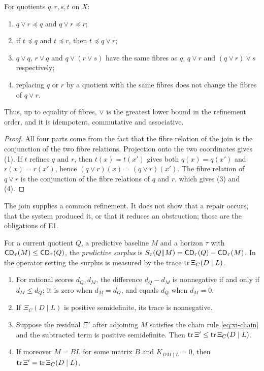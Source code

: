 \begin{proposition}\label{prop:d1}
For quotients $q, r, s, t$ on $X$:
\begin{enumerate}
  \item $q \vee r \preceq q$ and $q \vee r \preceq r$;
  \item if $t \preceq q$ and $t \preceq r$, then $t \preceq q \vee r$;
  \item $q \vee q$, $r \vee q$ and $q \vee (r \vee s)$ have the same fibres as $q$, $q \vee r$ and
    $(q \vee r) \vee s$ respectively;
  \item replacing $q$ or $r$ by a quotient with the same fibres does not change the fibres of
    $q \vee r$.
\end{enumerate}
Thus, up to equality of fibres, $\vee$ is the greatest lower bound in the refinement order, and it
is idempotent, commutative and associative.
\end{proposition}

\begin{proof}
All four parts come from the fact that the fibre relation of the join is the conjunction of the two fibre relations.
Projection onto the two coordinates gives (1). If $t$ refines $q$ and $r$, then $t(x) = t(x')$
gives both $q(x) = q(x')$ and $r(x) = r(x')$, hence $(q \vee r)(x) = (q \vee r)(x')$. The fibre
relation of $q \vee r$ is the conjunction of the fibre relations of $q$ and $r$, which gives (3)
and (4).
\end{proof}

The join supplies a common refinement. It does not show that a repair occurs, that the system
produced it, or that it reduces an obstruction; those are the obligations of E1.

\begin{definition}\label{def:d2}
For a current quotient $Q$, a predictive baseline $M$ and a horizon $\tau$ with
$\mathsf{CD}_\tau(M) \le \mathsf{CD}_\tau(Q)$, the \emph{predictive surplus} is
$S_\tau(Q \Vert M) = \mathsf{CD}_\tau(Q) - \mathsf{CD}_\tau(M)$. In the operator setting the surplus is measured by
the trace $\operatorname{tr} \Xi_C(D \mid L)$.
\end{definition}

\begin{proposition}\label{prop:d2}
\begin{enumerate}
  \item For rational scores $d_Q, d_M$, the difference $d_Q - d_M$ is nonnegative if and only if
    $d_M \le d_Q$; it is zero when $d_M = d_Q$, and equals $d_Q$ when $d_M = 0$.
  \item If $\Xi_C(D \mid L)$ is positive semidefinite, its trace is nonnegative.
  \item Suppose the residual $\Xi'$ after adjoining $M$ satisfies the chain rule
    \eqref{eq:xi-chain} and the subtracted term is positive semidefinite. Then
    $\operatorname{tr} \Xi' \le \operatorname{tr} \Xi_C(D \mid L)$.
  \item If moreover $M = BL$ for some matrix $B$ and $K_{DM\mid L} = 0$, then
    $\operatorname{tr} \Xi' = \operatorname{tr} \Xi_C(D \mid L)$.
\end{enumerate}
\end{proposition}

